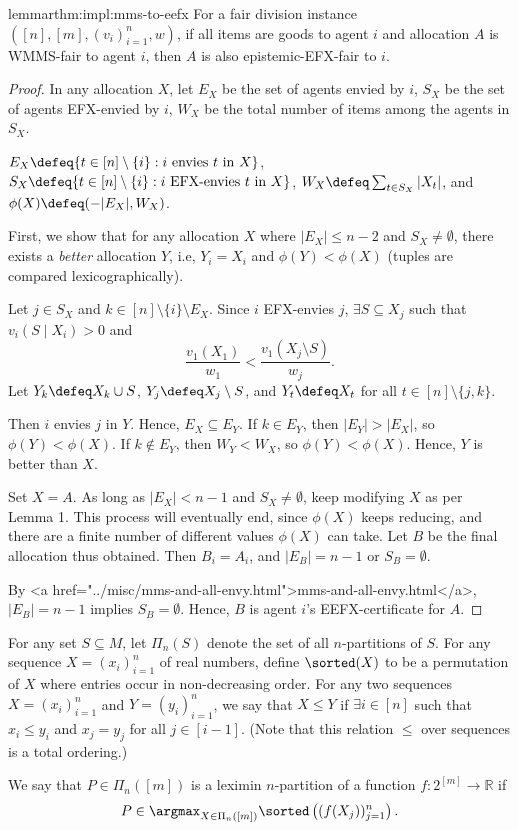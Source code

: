 \begin{restatable}{lemma}{rthm:impl:mms-to-eefx}
\label{thm:impl:mms-to-eefx}
For a fair division instance $([n], [m], (v_i)_{i=1}^n, w)$,
if all items are goods to agent $i$ and allocation $A$ is WMMS-fair to agent $i$,
then $A$ is also epistemic-EFX-fair to $i$.
\end{restatable}
\begin{proof}
In any allocation $X$, let
$E_X$ be the set of agents envied by $i$,
$S_X$ be the set of agents EFX-envied by $i$,
$W_X$ be the total number of items among the agents in $S_X$.

$E_X \defeq \{t \in [n] \setminus \{i\}: i \textrm{ envies } t \textrm{ in } X\}$,
$S_X \defeq \{t \in [n] \setminus \{i\}: i \textrm{ EFX-envies } t \textrm{ in } X\}$,
$W_X \defeq \sum_{t \in S_X} |X_t|$, and $\phi(X) \defeq (-|E_X|, W_X)$.

First, we show that for any allocation $X$ where $|E_X| \le n-2$ and $S_X \neq \emptyset$,
there exists a \emph{better} allocation $Y$, i.e, $Y_i = X_i$ and $\phi(Y) < \phi(X)$
(tuples are compared lexicographically).

Let $j \in S_X$ and $k \in [n] \setminus \{i\} \setminus E_X$.
Since $i$ EFX-envies $j$, $\exists S \subseteq X_j$ such that $v_i(S \mid X_i) > 0$ and
\[ \frac{v_1(X_1)}{w_1} < \frac{v_1(X_j \setminus S)}{w_j}. \]
Let $Y_k \defeq X_k \cup S$, $Y_j \defeq X_j \setminus S$,
and $Y_t \defeq X_t$ for all $t \in [n] \setminus \{j, k\}$.

Then $i$ envies $j$ in $Y$. Hence, $E_X \subseteq E_Y$.
If $k \in E_Y$, then $|E_Y| > |E_X|$, so $\phi(Y) < \phi(X)$.
If $k \not\in E_Y$, then $W_Y < W_X$, so $\phi(Y) < \phi(X)$.
Hence, $Y$ is better than $X$.

Set $X = A$. As long as $|E_X| < n-1$ and $S_X \neq \emptyset$,
keep modifying $X$ as per Lemma 1.
This process will eventually end, since $\phi(X)$ keeps reducing,
and there are a finite number of different values $\phi(X)$ can take.
Let $B$ be the final allocation thus obtained.
Then $B_i = A_i$, and $|E_B| = n-1$ or $S_B = \emptyset$.

By <a href="../misc/mms-and-all-envy.html">mms-and-all-envy.html</a>,
$|E_B| = n-1$ implies $S_B = \emptyset$.
Hence, $B$ is agent $i$'s EEFX-certificate for $A$.
\end{proof}

\begin{definition}
\label{defn:leximin}
For any set $S \subseteq M$, let $\Pi_n(S)$ denote the set of all $n$-partitions of $S$.
For any sequence $X = (x_i)_{i=1}^n$ of real numbers, define $\sorted(X)$ to be a permutation of $X$
where entries occur in non-decreasing order.
For any two sequences $X = (x_i)_{i=1}^n$ and $Y = (y_i)_{i=1}^n$, we say that $X \le Y$ if
$\exists i \in [n]$ such that $x_i \le y_i$ and $x_j = y_j$ for all $j \in [i-1]$.
(Note that this relation $\le$ over sequences is a total ordering.)

We say that $P \in \Pi_n([m])$ is a leximin $n$-partition of a function $f: 2^{[m]} \to \mathbb{R}$ if
\[ P \in \argmax_{X \in \Pi_n([m])} \sorted\left((f(X_j))_{j=1}^n\right). \]
\end{definition}


